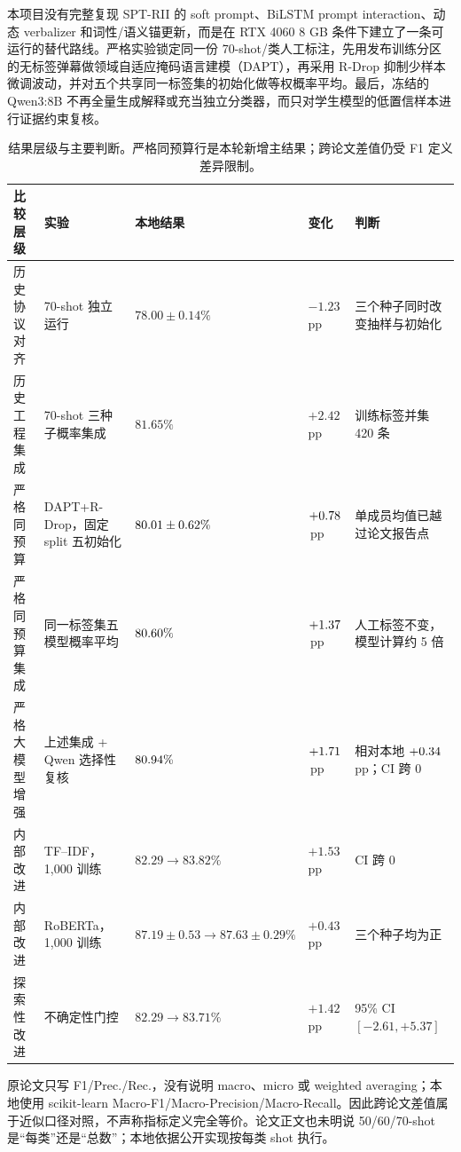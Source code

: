 \documentclass[UTF8,zihao=-4,a4paper]{ctexart}
\newcommand{\pp}{\,pp}
\begin{document}
本项目没有完整复现 SPT-RII 的 soft prompt、BiLSTM prompt interaction、动态 verbalizer 和词性/语义锚更新，而是在 RTX 4060 8 GB 条件下建立了一条可运行的替代路线。严格实验锁定同一份 70-shot/类人工标注，先用发布训练分区的无标签弹幕做领域自适应掩码语言建模（DAPT），再采用 R-Drop 抑制少样本微调波动，并对五个共享同一标签集的初始化做等权概率平均。最后，冻结的 Qwen3:8B 不再全量生成解释或充当独立分类器，而只对学生模型的低置信样本进行证据约束复核。

\begin{table}[H]
\centering
\footnotesize
\caption{结果层级与主要判断。严格同预算行是本轮新增主结果；跨论文差值仍受 F1 定义差异限制。}
\label{tab:summary}
\begin{tabularx}{\textwidth}{p{2.15cm}p{3.15cm}p{4.25cm}p{1.65cm}X}
\toprule
比较层级 & 实验 & 本地结果 & 变化 & 判断 \\
\midrule
历史协议对齐 & 70-shot 独立运行 & $78.00\pm0.14\%$ & $-1.23$\pp & 三个种子同时改变抽样与初始化 \\
历史工程集成 & 70-shot 三种子概率集成 & $81.65\%$ & $+2.42$\pp & 训练标签并集 420 条 \\
\rowcolor{LightGreen}严格同预算 & DAPT+R-Drop，固定 split 五初始化 & $80.01\pm0.62\%$ & $+0.78$\pp & 单成员均值已越过论文报告点 \\
严格同预算集成 & 同一标签集五模型概率平均 & $80.60\%$ & $+1.37$\pp & 人工标签不变，模型计算约 5 倍 \\
\rowcolor{LightGreen}严格大模型增强 & 上述集成 + Qwen 选择性复核 & $80.94\%$ & $+1.71$\pp & 相对本地 $+0.34$\pp；CI 跨 0 \\
内部改进 & TF--IDF，1,000 训练 & $82.29\to83.82\%$ & $+1.53$\pp & CI 跨 0 \\
内部改进 & RoBERTa，1,000 训练 & $87.19\pm0.53\to87.63\pm0.29\%$ & $+0.43$\pp & 三个种子均为正 \\
探索性改进 & 不确定性门控 & $82.29\to83.71\%$ & $+1.42$\pp & 95\% CI $[-2.61,+5.37]$ \\
\bottomrule
\end{tabularx}
\end{table}

\begin{warningbox}[指标口径]
原论文只写 F1/Prec./Rec.，没有说明 macro、micro 或 weighted averaging；本地使用 scikit-learn Macro-F1/Macro-Precision/Macro-Recall。因此跨论文差值属于近似口径对照，不声称指标定义完全等价。论文正文也未明说 50/60/70-shot 是“每类”还是“总数”；本地依据公开实现按每类 shot 执行。
\end{warningbox}
\end{document}
